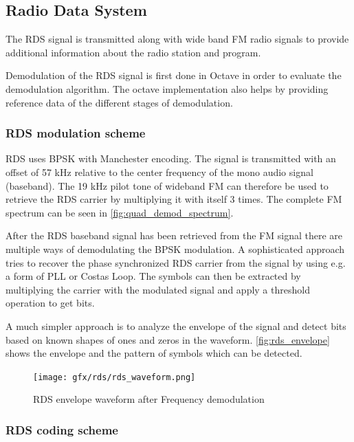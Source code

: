 \subsection{Radio Data System \label{sec:rds}}

The \ac{RDS} signal is transmitted along with wide band \ac{FM}
radio signals to provide additional information about the
radio station and program.

Demodulation of the \ac{RDS} signal is first done in Octave in order to
evaluate the demodulation algorithm. The octave implementation
also helps by providing reference data of the different stages
of demodulation. 

\subsubsection{RDS modulation scheme}
\label{sec:rds_modulation_scheme}

\ac{RDS} uses \ac{BPSK} with Manchester encoding. The signal is
transmitted with an offset of 57 kHz relative to the center frequency
of the mono audio signal (baseband). The 19 kHz pilot tone of wideband \ac{FM}
can therefore be used to retrieve the \ac{RDS} carrier by multiplying
it with itself 3 times. The complete FM spectrum can be seen in
\autoref{fig:quad_demod_spectrum}.

After the \ac{RDS} baseband signal has been retrieved from the \ac{FM} signal
there are multiple ways of demodulating the \ac{BPSK} modulation. A sophisticated
approach tries to recover the phase synchronized \ac{RDS} carrier from the
signal by using e.g. a form of \ac{PLL} or Costas Loop. The symbols can then
be extracted by multiplying the carrier with the modulated signal and apply
a threshold operation to get bits.

A much simpler approach is to analyze the envelope of the signal and detect
bits based on known shapes of ones and zeros in the waveform.
\autoref{fig:rds_envelope} shows the envelope and the pattern of symbols
which can be detected.

\begin{figure}
	\centering
	\texttt{[image: gfx/rds/rds\_waveform.png]}
	\caption[RDS envelope waveform after Frequency demodulation]{RDS envelope waveform after Frequency demodulation \cite{1999:iec62106}}
	\label{fig:rds_envelope}
\end{figure}



\subsubsection{RDS coding scheme}

